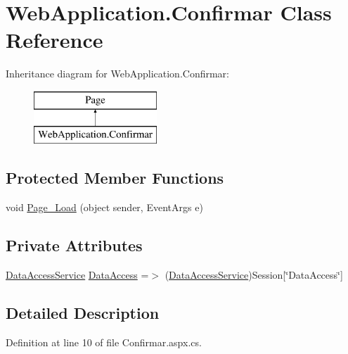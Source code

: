 \hypertarget{classWebApplication_1_1Confirmar}{}\section{Web\+Application.\+Confirmar Class Reference}
\label{classWebApplication_1_1Confirmar}
Inheritance diagram for Web\+Application.\+Confirmar\+:\begin{figure}[H]
\begin{center}
\leavevmode
\includegraphics[height=2.000000cm]{de/d14/classWebApplication_1_1Confirmar}
\end{center}
\end{figure}
\subsection*{Protected Member Functions}
\begin{DoxyCompactItemize}
\item 
void \mbox{\hyperlink{classWebApplication_1_1Confirmar_a0ba1fd0d9bb4844635cf79b6762cb42b}{Page\+\_\+\+Load}} (object sender, Event\+Args e)
\end{DoxyCompactItemize}
\subsection*{Private Attributes}
\begin{DoxyCompactItemize}
\item 
\mbox{\hyperlink{classDataBaseAccess_1_1DataAccessService}{Data\+Access\+Service}} \mbox{\hyperlink{classWebApplication_1_1Confirmar_ac2223a11ebcaa342108a44f9c8277855}{Data\+Access}} =$>$ (\mbox{\hyperlink{classDataBaseAccess_1_1DataAccessService}{Data\+Access\+Service}})Session\mbox{[}\char`\"{}Data\+Access\char`\"{}\mbox{]}
\end{DoxyCompactItemize}


\subsection{Detailed Description}


Definition at line 10 of file Confirmar.\+aspx.\+cs.



